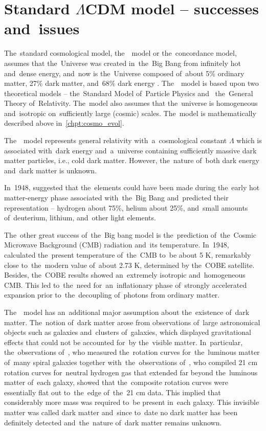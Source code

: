 \section{Standard $\Lambda$CDM model -- successes and~issues}
The~standard cosmological model, the~\LCDM\ model or the~concordance model, assumes that the~Universe was created in~the~Big Bang from infinitely hot and~dense energy, and~now is the~Universe composed of~about 5\% ordinary matter, 27\% dark matter, and~68\% dark energy \parencite{redefineLCDM}. The~\LCDM\ model is based upon two theoretical models -- the~Standard Model of~Particle Physics and~ the~General Theory of~Relativity. The~model also assumes that the~universe is homogeneous and~isotropic on~sufficiently large (cosmic) scales. The~model is mathematically described above in~\autoref{chpt:cosmo_evol}.

The~\LCDM\ model represents general relativity with~a~cosmological constant \(\Lambda\) which is associated with~dark energy and~a~universe containing sufficiently massive dark matter particles, i.e., cold dark matter. However, the~nature of~both dark energy and~dark matter is unknown.

In~1948, \textcite{PhysRev.74.505.2} suggested that the~elements could have been made during the~early hot matter-energy phase associated with~the~Big Bang and~predicted their representation -- hydrogen about 75\%, helium about 25\%, and~small amounts of~deuterium, lithium, and~other light elements.

The~other great success of~the~Big bang model is the~prediction of~the~Cosmic Microwave Background (CMB) radiation and~its temperature. In~1948, \textcite{1948Natur.162..774A} calculated the~present temperature of~the~CMB to~be about 5 K, remarkably close to~the~modern value of~about 2.73 K, determined by the~COBE satellite. Besides, the~COBE results showed an~extremely isotropic and~homogeneous CMB. This led to~the~need for~an~inflationary phase \parencite{1981PhRvD..23..347G} of~strongly accelerated expansion prior to~the~decoupling of~photons from ordinary matter.

The~\LCDM\ model has an~additional major assumption about the~existence of~dark matter. The~notion of~dark matter arose from observations of~large astronomical objects such as galaxies and~clusters of~galaxies, which displayed gravitational effects that could not be accounted for~by the~visible matter. In~particular, the~observations of~\textcite{1980ApJ...238..471R}, who measured the~rotation curves for~the~luminous matter of~many spiral galaxies together with~the~observations of~\textcite{1978PhDT.......195B}, who compiled 21 cm rotation curves for~neutral hydrogen gas that extended far beyond the~luminous matter of~each galaxy, showed that the~composite rotation curves were essentially flat out to~the~edge of~the~21 cm data. This implied that considerably more mass was required to~be present in~each galaxy. This invisible matter was called dark matter and~since to~date no dark matter has been definitely detected and~the~nature of~dark matter remains unknown.

